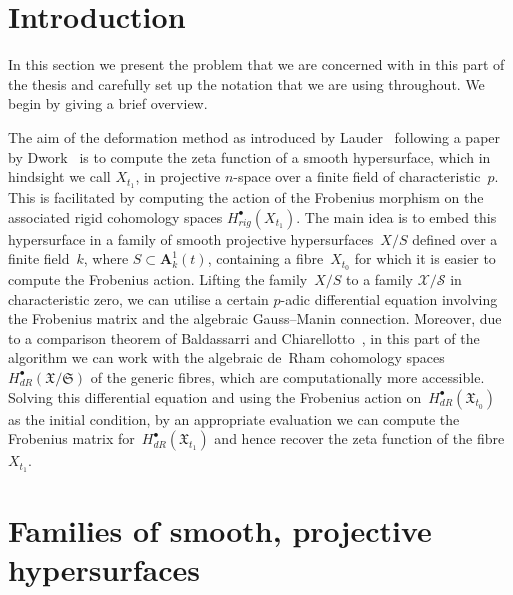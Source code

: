 

\section{Introduction}

In this section we present the problem that we are concerned 
with in this part of the thesis and carefully set up the notation 
that we are using throughout.  We begin by giving a brief overview.

The aim of the deformation method as introduced by 
Lauder~\citep{Lau04} following a paper by Dwork~\citep{Dwork62b} 
is to compute the zeta function of a smooth 
hypersurface, which in hindsight we call $X_{t_1}$, in projective 
$n$-space over a finite field of characteristic~$p$.  This is 
facilitated by computing 
the action of the Frobenius morphism on the associated rigid cohomology 
spaces $H_{rig}^{\bullet}(X_{t_1})$.  The main idea is to embed this 
hypersurface in a family of smooth projective hypersurfaces~$X/S$ 
defined over a finite field~$k$, where $S \subset \mathbf{A}_k^1(t)$, 
containing a fibre~$X_{t_0}$ for which it is easier to compute the Frobenius 
action. Lifting the family~$X/S$ to a family $\mathcal{X}/\mathcal{S}$ in 
characteristic zero, we can utilise a certain $p$-adic differential 
equation involving the Frobenius matrix and the algebraic Gauss--Manin 
connection.  Moreover, due to a comparison theorem of Baldassarri and 
Chiarellotto~\citep{BalChi94}, in this 
part of the algorithm we can work with the algebraic de~Rham cohomology 
spaces~$H_{dR}^{\bullet}(\mathfrak{X}/\mathfrak{S})$ of the generic 
fibres, which are computationally more accessible.  Solving this differential 
equation and using the Frobenius action 
on~$H_{dR}^{\bullet}(\mathfrak{X}_{t_0})$ as the initial 
condition, by an appropriate evaluation we can compute the Frobenius matrix 
for~$H_{dR}^{\bullet}(\mathfrak{X}_{t_1})$ and hence recover the 
zeta function of the fibre~$X_{t_1}$.


\section{Families of smooth, projective hypersurfaces}

